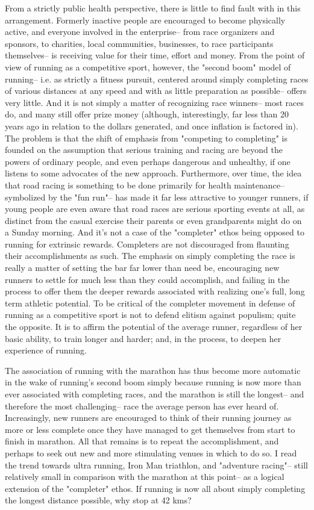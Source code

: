 From a strictly public health perspective, there is little to find fault with in this arrangement. Formerly inactive people are encouraged to become physically active, and everyone involved in the enterprise-- from race organizers and sponsors, to charities, local communities, businesses, to race participants themselves-- is receiving value for their time, effort and money. From the point of view of running as a competitive sport, however, the "second boom" model of running-- i.e. as strictly a fitness pursuit, centered around simply completing races of various distances at any speed and with as little preparation as possible-- offers very little. And it is not simply a matter of recognizing race winners-- most races do, and many still offer prize money (although, interestingly, far less than 20 years ago in relation to the dollars generated, and once inflation is factored in). The problem is that the shift of emphasis from "competing to completing" is founded on the assumption that serious training and racing are beyond the powers of ordinary people, and even perhaps dangerous and unhealthy, if one listens to some advocates of the new approach. Furthermore, over time, the idea that road racing is something to be done primarily for health maintenance-- symbolized by the "fun run"-- has made it far less attractive to younger runners, if young people are even aware that road races are serious sporting events at all, as distinct from the casual exercise their parents or even grandparents might do on a Sunday morning. And it's not a case of the "completer" ethos being opposed to running for extrinsic rewards. Completers are not discouraged from flaunting their accomplishments as such. The emphasis on simply completing the race is really a matter of setting the bar far lower than need be, encouraging new runners to settle for much less than they could accomplish, and failing in the process to offer them the deeper rewards associated with realizing one's full, long term athletic potential. To be critical of the completer movement in defense of running as a competitive sport is not to defend elitism against populism; quite the opposite. It is to affirm the potential of the average runner, regardless of her basic ability, to train longer and harder; and, in the process, to deepen her experience of running.

The association of running with the marathon has thus become more automatic in the wake of running's second boom simply because running is now more than ever associated with completing races, and the marathon is still the longest-- and therefore the most challenging-- race the average person has ever heard of. Increasingly, new runners are encouraged to think of their running journey as more or less complete once they have managed to get themselves from start to finish in marathon. All that remains is to repeat the accomplishment, and perhaps to seek out new and more stimulating venues in which to do so. I read the trend towards ultra running, Iron Man triathlon, and "adventure racing"-- still relatively small in comparison with the marathon at this point-- as a logical extension of the "completer" ethos. If running is now all about simply completing the longest distance possible, why stop at 42 kms?

